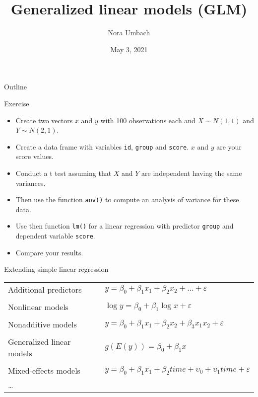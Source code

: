 \documentclass{beamer}
\title{Generalized linear models (GLM)}
\author{Nora Umbach%
}
\date{May 3, 2021}
\begin{document}
\begin{frame}{}
\thispagestyle{empty}
\titlepage
\end{frame}

\begin{frame}{Outline}
\tableofcontents
\end{frame}

\begin{frame}{}
  \begin{block}{Exercise}
    \begin{itemize}
      \item Create two vectors $x$ and $y$ with 100 observations each and
        $X \sim N(1,1)$ and $Y \sim N(2,1)$.
      \item Create a data frame with variables \texttt{id}, \texttt{group}
        and \texttt{score}. $x$ and $y$ are your score values.
      \item Conduct a t test assuming that $X$ and $Y$ are independent 
        having the same variances.
      \item Then use the function \texttt{aov()} to compute an analysis of
        variance for these data.
      \item Use then function \texttt{lm()} for a linear regression with
        predictor \texttt{group} and dependent variable \texttt{score}.
      \item Compare your results.
    \end{itemize}
  \end{block}
\end{frame}

\begin{frame}{Extending simple linear regression}
  \begin{tabular}{ll}
    Additional predictors &
      $y = \beta_0 + \beta_1 x_1 + \beta_2 x_2 + \dots +
      \varepsilon$\\
      & \\
    Nonlinear models &
      $\log y = \beta_0 + \beta_1 \log x + \varepsilon$\\
      & \\
    Nonadditive models &
      $y = \beta_0 + \beta_1 x_1 + \beta_2 x_2 + \beta_3
      x_1 x_2 + \varepsilon$\\
      & \\
    Generalized linear models &
      $g(E(y)) = \beta_0 + \beta_1 x$\\
      & \\
    Mixed-effects models &
      $y = \beta_0 + \beta_1 x_1 + \beta_2 time + 
      \upsilon_0 + \upsilon_1 time + \varepsilon$\\
      \dots & \\
  \end{tabular}
\end{frame}
\end{document}
